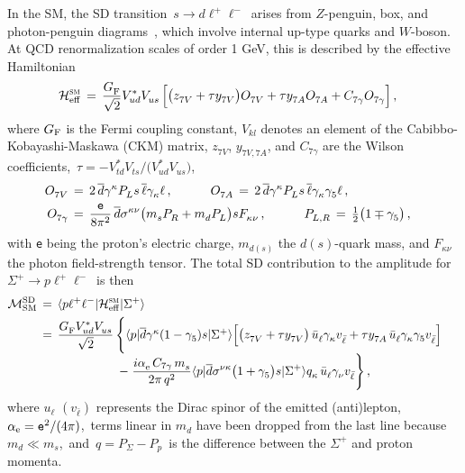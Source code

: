 \documentclass[amsmath,amssymb,aps,nofootinbib,prd,preprint,superscriptaddress,tightenlines,a4paper,bm]{revtex4-2}
\begin{document}
In the SM, the SD transition \,$s\to d\ell^+\ell^-$\, arises from $Z$-penguin, box, and photon-penguin diagrams~\cite{Shifman:1976de,Inami:1980fz,Buchalla:1995vs}, which involve internal up-type quarks and $W$-boson.
At QCD renormalization scales of order 1 GeV, this is described by the effective Hamiltonian~\cite{Buchalla:1995vs}
\begin{align} \label{smH}
{\cal H}_{\rm eff}^{\textsc{sm}} & \,=\, \frac{G_{\rm F}^{}}{\sqrt{2}} V_{ud}^* V_{us}^{}\,
\Big[ \bigl(z_{7V}^{}+\tau y_{7V}^{}\bigr) O_{7V}^{}+ \tau y_{7A}^{} O_{7A}^{} + C_{7\gamma}^{} O_{7\gamma}^{} \Big] \,, &
\end{align}
where $G_{\rm F}$ is the Fermi coupling constant, $V_{kl}$ denotes an element of the Cabibbo-Kobayashi-Maskawa (CKM) matrix,
$z_{7V}^{}$, $y_{7V,7A}^{}$, and $C_{7\gamma}$ are the Wilson coefficients,
$\,\tau =- V_{td}^*V_{ts}^{}/\bigl(V_{ud}^*V_{us}^{}\bigr)$,\,
\begin{align} \label{ops}
O_{7V}^{}  & \,=\, 2\,\overline d\gamma^\kappa P_L^{} s\, \overline\ell\gamma_\kappa^{}\ell \,, \hspace{3em}
O_{7A}^{} \,=\, 2\,\overline d\gamma^\kappa  P_L^{} s\, \overline\ell\gamma_\kappa^{}\gamma_5^{}\ell \,,
\nonumber \\
O_{7\gamma}^{} & \,=\, \frac{\tt e}{8\pi^2}\, \overline d \sigma^{\kappa\nu} \big( m_s^{} P_R^{} + m_d^{}  P_L^{} \big) s F_{\kappa\nu}^{} \,, \hspace{3em} P_{L,R}^{} \,=\, \tfrac{1}{2} \big(1\mp\gamma_5^{}\big) \,, &
\end{align}
with {\tt e} being the proton's electric charge, $m_{d(s)}$ the $d(s)$-quark mass, and $F_{\kappa\nu}^{}$ the photon field-strength tensor.
The total SD contribution to the amplitude for \,$\Sigma^+\to p\ell^+\ell^-$\, is then
\begin{align} \label{Msd}
{\cal M}_{\rm SM}^{\rm SD} & \,=\, \langle p\ell^+\ell^-|{\cal H}_{\rm eff}^{\textsc{sm}}|\Sigma^+\rangle
\nonumber \\ & \,=\, \frac{G_{\rm F}^{}V_{ud}^*V_{us}^{}}{\sqrt2} \!\! \begin{array}[t]{l} \Bigg\{ \langle p|\overline d\gamma^\kappa(1-\gamma_5^{})s|\Sigma^+\rangle \Big[ \big(z_{7V}^{}+\tau y_{7V}^{}\big)\, \bar u_\ell^{}\gamma_\kappa^{}v_{\bar\ell}^{} + \tau y_{7A}^{}\,  \bar u_\ell^{}\gamma_\kappa^{}\gamma_5^{}v_{\bar\ell}^{} \Big]
\\ \displaystyle \;-\; \frac{i \alpha_{\rm e}^{}\, C_{7\gamma}\, m_s^{}}{2\pi\,q^2} \langle p|\overline d \sigma^{\nu\kappa}\big(1+\gamma_5^{}\big)s|\Sigma^+\rangle q_\kappa^{}\, \bar u_\ell^{}\gamma_\nu^{}v_{\bar\ell}^{}\Bigg\} \,, \end{array} &
\end{align}
where $u_\ell^{}$ $(v_{\bar\ell})$ represents the Dirac spinor of the emitted (anti)lepton, \,$\alpha_{\rm e}={\tt e}^2/(4\pi)$,\, terms linear in $m_d$ have been dropped from the last line because \,$m_d\ll m_s$,\, and \,$q=P_\Sigma^{}-P_p$\, is the difference between the $\Sigma^+$ and proton momenta.
\end{document}
